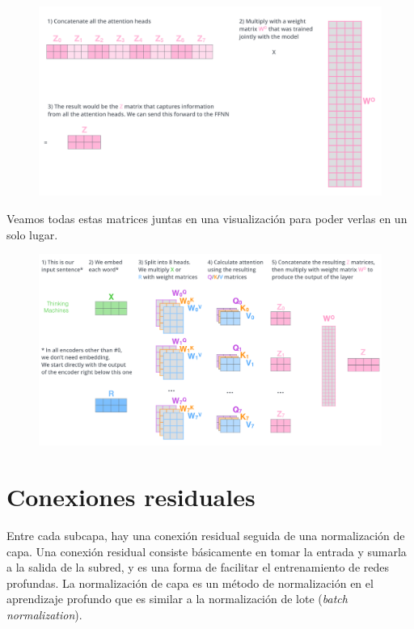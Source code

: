 \begin{figure}[h]
  \centering
  \includegraphics[scale=0.22]{pics/transformer_attention_heads_weight_matrix_o.png}
\end{figure}

Veamos todas estas matrices juntas en una visualización para poder verlas en un solo lugar.

\begin{figure}[h]
  \centering
  \includegraphics[scale=0.226]{pics/transformer_multi-headed_self-attention-recap.png}
\end{figure}

\section{Conexiones residuales}
Entre cada subcapa, hay una conexión residual seguida de una normalización de capa.
Una conexión residual consiste básicamente en tomar la entrada y sumarla a la salida de la subred, y es una forma de facilitar el entrenamiento de redes profundas.
La normalización de capa es un método de normalización en el aprendizaje profundo que es similar a la normalización de lote (\textit{batch normalization}).

